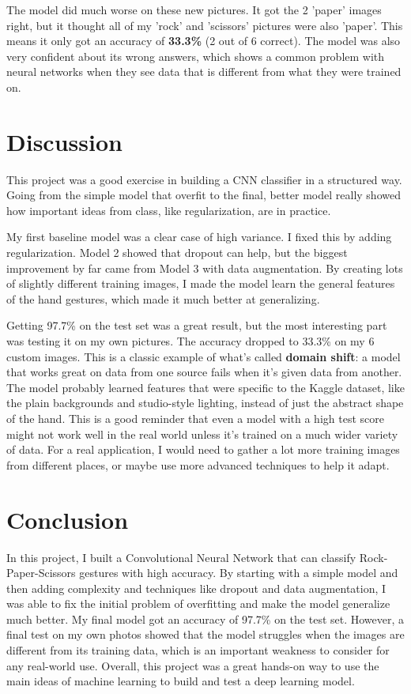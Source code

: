 \documentclass[pdflatex,sn-mathphys-num]{sn-jnl}%
\theoremstyle{thmstyleone}%
\theoremstyle{thmstyletwo}%
\theoremstyle{thmstylethree}%
\begin{document}
The model did much worse on these new pictures. It got the 2 'paper' images right, but it thought all of my 'rock' and 'scissors' pictures were also 'paper'. This means it only got an accuracy of \textbf{33.3\%} (2 out of 6 correct). The model was also very confident about its wrong answers, which shows a common problem with neural networks when they see data that is different from what they were trained on.

\section{Discussion}\label{sec12}

This project was a good exercise in building a CNN classifier in a structured way. Going from the simple model that overfit to the final, better model really showed how important ideas from class, like regularization, are in practice.

My first baseline model was a clear case of high variance. I fixed this by adding regularization. Model 2 showed that dropout can help, but the biggest improvement by far came from Model 3 with data augmentation. By creating lots of slightly different training images, I made the model learn the general features of the hand gestures, which made it much better at generalizing.

Getting 97.7\% on the test set was a great result, but the most interesting part was testing it on my own pictures. The accuracy dropped to 33.3\% on my 6 custom images. This is a classic example of what's called \textbf{domain shift}: a model that works great on data from one source fails when it's given data from another. The model probably learned features that were specific to the Kaggle dataset, like the plain backgrounds and studio-style lighting, instead of just the abstract shape of the hand. This is a good reminder that even a model with a high test score might not work well in the real world unless it's trained on a much wider variety of data. For a real application, I would need to gather a lot more training images from different places, or maybe use more advanced techniques to help it adapt.

\section{Conclusion}\label{sec13}

In this project, I built a Convolutional Neural Network that can classify Rock-Paper-Scissors gestures with high accuracy. By starting with a simple model and then adding complexity and techniques like dropout and data augmentation, I was able to fix the initial problem of overfitting and make the model generalize much better. My final model got an accuracy of 97.7\% on the test set. However, a final test on my own photos showed that the model struggles when the images are different from its training data, which is an important weakness to consider for any real-world use. Overall, this project was a great hands-on way to use the main ideas of machine learning to build and test a deep learning model.
\end{document}
